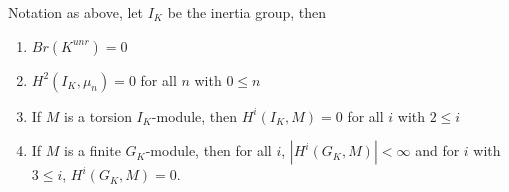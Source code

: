\begin{proposition}
Notation as above, let $I_K$ be the inertia group, then
	\begin{enumerate}[(1)]
		\item \(Br(K^{unr}) = 0\)
		\item \(H^{2}(I_{K},\mu_{n}) = 0\) for all \(n\) with \(0 \leq n\)
		\item If \(M\) is a torsion \(I_{K}\)-module, then
			\(H^{i}(I_{K},M) = 0\) for all \(i\) with \(2 \leq i\)
		\item If \(M\) is a finite \(G_{K}\)-module, then
			for all \(i\), \(\left| H^{i}(G_{K},M) \right| < \infty\) 
			and for \(i\) with \(3 \leq i\), 
			\(H^{i}(G_{K},M) = 0\).
	\end{enumerate}
\end{proposition}




